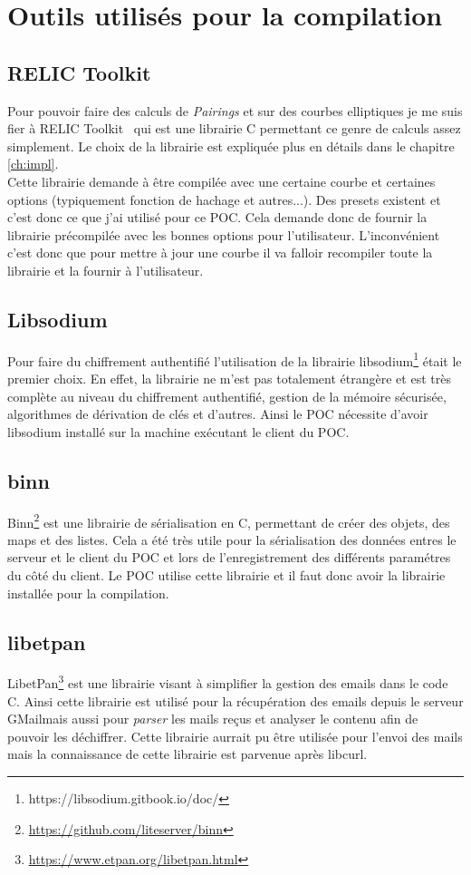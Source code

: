 \chapter{Outils utilisés pour la compilation}

\section{RELIC Toolkit}
Pour pouvoir faire des calculs de \textit{Pairings} et sur des courbes elliptiques je me suis fier à RELIC Toolkit~\cite{relic-toolkit} qui est une librairie C permettant ce genre de calculs assez simplement. Le choix de la librairie est expliquée plus en détails dans le chapitre \ref{ch:impl}.\\
Cette librairie demande à être compilée avec une certaine courbe et certaines options (typiquement fonction de hachage et autres...). Des presets existent et c'est donc ce que j'ai utilisé pour ce POC. Cela demande donc de fournir la librairie précompilée avec les bonnes options pour l'utilisateur. L'inconvénient c'est donc que pour mettre à jour une courbe il va falloir recompiler toute la librairie et la fournir à l'utilisateur.
\section{Libsodium}
Pour faire du chiffrement authentifié l'utilisation de la librairie  libsodium\footnote{https://libsodium.gitbook.io/doc/} était le premier choix. En effet, la librairie ne m'est pas totalement étrangère et est très complète au niveau du chiffrement authentifié, gestion de la mémoire sécurisée, algorithmes de dérivation de clés et d'autres. Ainsi le POC nécessite d'avoir libsodium installé sur la machine exécutant le client du POC.
\section{binn}
Binn\footnote{\url{https://github.com/liteserver/binn}} est une librairie de sérialisation en C, permettant de créer des objets, des maps et des listes. Cela a été très utile pour la sérialisation des données entres le serveur et le client du POC et lors de l'enregistrement des différents paramétres du côté du client. Le POC utilise cette librairie et il faut donc avoir la librairie installée pour la compilation.
\section{libetpan}
LibetPan\footnote{\url{https://www.etpan.org/libetpan.html}} est une librairie visant à simplifier la gestion des emails dans le code C. Ainsi cette librairie est utilisé pour la récupération des emails depuis le serveur GMailmais aussi pour \textit{parser} les mails reçus et analyser le contenu afin de pouvoir les déchiffrer. Cette librairie aurrait pu être utilisée pour l'envoi des mails mais la connaissance de cette librairie est parvenue après libcurl.
